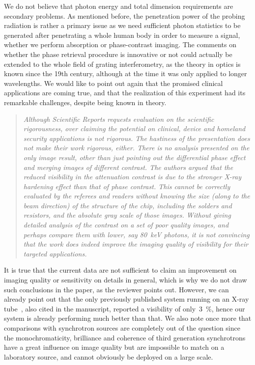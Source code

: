 \documentclass[a4paper,english]{scrartcl}
\newenvironment{reviewerquote}{\begin{quote}\itshape}{\end{quote}}
\begin{document}
We do not believe that photon energy and total dimension
requirements are secondary problems. As mentioned before, the penetration
power of the probing radiation is rather a primary issue as we need
sufficient photon statistics to be generated after penetrating a whole human
body in order to measure a signal, whether we
perform absorption or phase-contrast imaging. The comments on whether the phase
retrieval procedure is innovative or not could actually be extended to the
whole field of grating interferometry, as the theory in optics is known
since the 19th century, although at the time it was only applied to longer
wavelengths. We would like to point out again that the promised clinical
applications are coming true, and that the realization of this experiment
had its remarkable challenges, despite being known in theory.

\begin{reviewerquote}
Although Scientific Reports requests evaluation on the
scientific rigorousness, over claiming the potential on clinical, device and
homeland security applications is not rigorous. The hastiness of the
presentation does not make their work rigorous, either. There is no analysis
presented on the only image result, other than just pointing out the
differential phase effect and merging images of different contrast. The
authors argued that the reduced visibility in the attenuation contrast is
due to the stronger X-ray hardening effect than that of phase contrast. This
cannot be correctly evaluated by the referees and readers without knowing
the size (along to the beam direction) of the structure of the chip,
including the solders and resistors, and the absolute gray scale of those
images. Without giving detailed analysis of the contrast on a set of poor
quality images, and perhaps compare them with lower, say \SI{80}{\kilo\eV} photons, it
is not convincing that the work does indeed improve the imaging quality of
visibility for their targeted applications.
\end{reviewerquote}

It is true that the current data are not sufficient to claim an improvement
on imaging quality or sensitivity on details in
general, which is why we do not draw such conclusions in the paper, as the
reviewer points out. However, we can already point out that the only
previously published system running on an X-ray tube~\cite{:/content/aip/journal/rsi/80/5/10.1063/1.3127712}, also
cited in the manuscript, reported a
visibility of only~\SI{3}{\percent}, hence our system is already performing
much better than that. We also note once more that comparisons with
synchrotron sources are completely out of the question since the
monochromaticity, brilliance and coherence of third generation synchrotrons
have a great influence on image quality but are impossible to match on a
laboratory source, and cannot obviously be deployed on a large scale.
\end{document}

